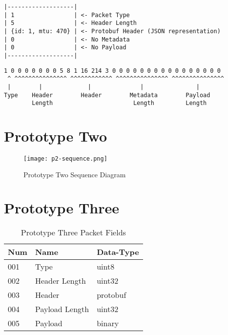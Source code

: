 \begin{lstlisting}[float,caption={Prototype One Example Packet Structure},label=lst:p1d-example-structure]
|-------------------|
| 1                 | <- Packet Type
| 5                 | <- Header Length
| {id: 1, mtu: 470} | <- Protobuf Header (JSON representation)
| 0                 | <- No Metadata
| 0                 | <- No Payload
|-------------------|
\end{lstlisting}

\begin{lstlisting}[float,caption={Prototype One Example Packet Binary},label=lst:p1d-example-binary]
 1 0 0 0 0 0 0 0 5 8 1 16 214 3 0 0 0 0 0 0 0 0 0 0 0 0 0 0 0 0
 ^ ^^^^^^^^^^^^^^^ ^^^^^^^^^^^^ ^^^^^^^^^^^^^^^ ^^^^^^^^^^^^^^^
 |        |             |              |               |
Type    Header        Header        Metadata        Payload
        Length                       Length         Length
\end{lstlisting}


\FloatBarrier


\section{Prototype Two}
\FloatBarrier
\begin{figure}[h!]
    \centering
    \texttt{[image: p2-sequence.png]}
    \caption{Prototype Two Sequence Diagram}
    \label{fig:p2-sequence}
\end{figure}

\FloatBarrier


\newpage
\section{Prototype Three}
\begin{table}[h!]
	\caption{Prototype Three Packet Fields}
	\label{tab:p3d-packet-fields}
	\centering
	\begin{tabular}{ l l l }
		\hline
		\textbf{Num} & \textbf{Name}  & \textbf{Data-Type} \\
		\hline
		001          & Type           & uint8              \\
		\hline
		002          & Header Length  & uint32             \\
		\hline
		003          & Header         & protobuf           \\
		\hline
		004          & Payload Length & uint32             \\
		\hline
		005          & Payload        & binary             \\
		\hline
	\end{tabular}
\end{table}

